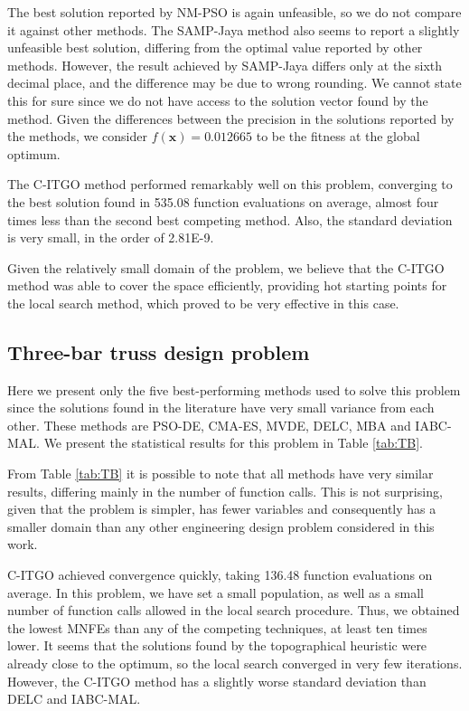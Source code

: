 The best solution reported by NM-PSO is again unfeasible, so we do not compare it against other methods. The SAMP-Jaya method also seems to report a slightly unfeasible best solution, differing from the optimal value reported by other methods. However, the result achieved by SAMP-Jaya differs only at the sixth decimal place, and the difference may be due to wrong rounding. We cannot state this for sure since we do not have access to the solution vector found by the method. Given the differences between the precision in the solutions reported by the methods, we consider $f(\bm{x}) = 0.012665$ to be the fitness at the global optimum.

The C-ITGO method performed remarkably well on this problem, converging to the best solution found in 535.08 function evaluations on average, almost four times less than the second best competing method. Also, the standard deviation is very small, in the order of 2.81E-9. 

Given the relatively small domain of the problem, we believe that the C-ITGO method was able to cover the space efficiently, providing hot starting points for the local search method, which proved to be very effective in this case.




\subsection{Three-bar truss design problem}




Here we present only the five best-performing methods used to solve this problem since the solutions found in the literature have very small variance from each other. These methods are PSO-DE, CMA-ES, MVDE, DELC, MBA and IABC-MAL. We present the statistical results for this problem in Table \ref{tab:TB}.



From Table \ref{tab:TB} it is possible to note that all methods have very similar results, differing mainly in the number of function calls. This is not surprising, given that the problem is simpler, has fewer variables and consequently has a smaller domain than any other engineering design problem considered in this work.

C-ITGO achieved convergence quickly, taking 136.48 function evaluations on average. In this problem, we have set a small population, as well as a small number of function calls allowed in the local search procedure. Thus, we obtained the lowest MNFEs than any of the competing techniques, at least ten times lower. It seems that the solutions found by the topographical heuristic were already close to the optimum, so the local search converged in very few iterations. However, the C-ITGO method has a slightly worse standard deviation than DELC and IABC-MAL.



